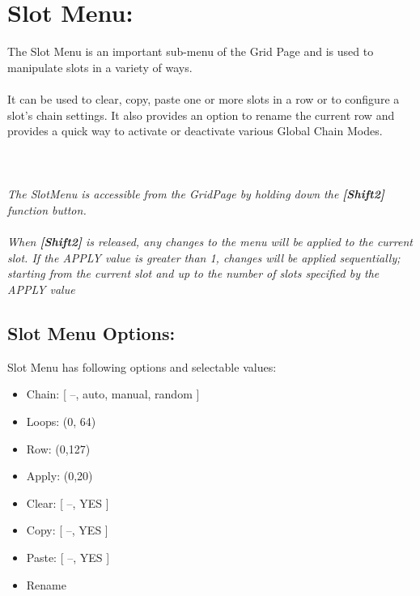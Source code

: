 \chapter{Slot Menu:}

The Slot Menu is an important sub-menu of the Grid Page and is used to manipulate slots in a variety of ways.\\\\
It can be used to clear, copy, paste one or more slots in a row or to configure a slot's chain settings. It also provides an option to rename the current row and provides a quick way to activate or deactivate various Global Chain Modes.
\\\\
\\\\
\textit{The SlotMenu is accessible from the GridPage by holding down the  \textbf{[Shift2]} function 
button.\\
\\When \textbf{[Shift2]} is released, any changes to the menu will be applied to the current slot. If the APPLY value is greater than 1, changes will be applied sequentially; starting from the current slot and up to the number of slots specified by the APPLY value}

\section{Slot Menu Options:}
Slot Menu has following options and selectable values:
\begin{itemize}

\item{Chain: [ --, auto, manual, random ]}


\item{Loops:  (0, 64)}
\item{Row:    (0,127)}
\item{Apply: (0,20)}
\item{Clear: [ --, YES ]}
\item{Copy: [ --, YES ]}
\item{Paste: [ --, YES ]}
\item{Rename}
\end{itemize}
